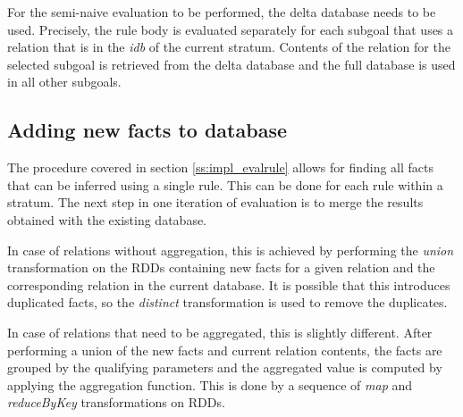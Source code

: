 For the semi-naive evaluation to be performed, the delta database needs to be used. Precisely, the rule body is evaluated separately for each subgoal that uses a relation that is in the \emph{idb} of the current stratum. Contents of the relation for the selected subgoal is retrieved from the delta database and the full database is used in all other subgoals.

\subsection{Adding new facts to database}\label{ss:impl_merge}

The procedure covered in section \ref{ss:impl_evalrule} allows for finding all facts that can be inferred using a single rule. This can be done for each rule within a stratum. The next step in one iteration of evaluation is to merge the results obtained with the existing database.

In case of relations without aggregation, this is achieved by performing the \emph{union} transformation on the RDDs containing new facts for a given relation and the corresponding relation in the current database. It is possible that this introduces duplicated facts, so the \emph{distinct} transformation is used to remove the duplicates.

In case of relations that need to be aggregated, this is slightly different. After performing a union of the new facts and current relation contents, the facts are grouped by the qualifying parameters and the aggregated value is computed by applying the aggregation function. This is done by a sequence of \emph{map} and \emph{reduceByKey} transformations on RDDs.

